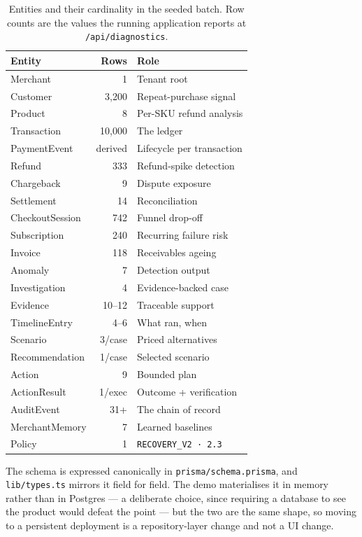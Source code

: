 \documentclass[10pt,twocolumn,a4paper]{article}
\newcommand{\code}[1]{\texttt{\small #1}}
\begin{document}
\begin{table}[t]
\centering
\small
\begin{tabular}{@{}l r l@{}}
\toprule
\textbf{Entity} & \textbf{Rows} & \textbf{Role} \\
\midrule
Merchant          & 1      & Tenant root \\
Customer          & 3{,}200 & Repeat-purchase signal \\
Product           & 8      & Per-SKU refund analysis \\
Transaction       & 10{,}000 & The ledger \\
PaymentEvent      & derived & Lifecycle per transaction \\
Refund            & 333    & Refund-spike detection \\
Chargeback        & 9      & Dispute exposure \\
Settlement        & 14     & Reconciliation \\
CheckoutSession   & 742    & Funnel drop-off \\
Subscription      & 240    & Recurring failure risk \\
Invoice           & 118    & Receivables ageing \\
\midrule
Anomaly           & 7      & Detection output \\
Investigation     & 4      & Evidence-backed case \\
Evidence          & 10--12 & Traceable support \\
TimelineEntry     & 4--6   & What ran, when \\
Scenario          & 3/case & Priced alternatives \\
Recommendation    & 1/case & Selected scenario \\
Action            & 9      & Bounded plan \\
ActionResult      & 1/exec & Outcome + verification \\
AuditEvent        & 31+    & The chain of record \\
MerchantMemory    & 7      & Learned baselines \\
Policy            & 1      & \code{RECOVERY\_V2 · 2.3} \\
\bottomrule
\end{tabular}
\caption{Entities and their cardinality in the seeded batch. Row counts are the
values the running application reports at \code{/api/diagnostics}.}
\label{tab:entities}
\end{table}

The schema is expressed canonically in \code{prisma/schema.prisma}, and
\code{lib/types.ts} mirrors it field for field. The demo materialises it in
memory rather than in Postgres --- a deliberate choice, since requiring a
database to see the product would defeat the point --- but the two are the same
shape, so moving to a persistent deployment is a repository-layer change and not
a UI change.
\end{document}
